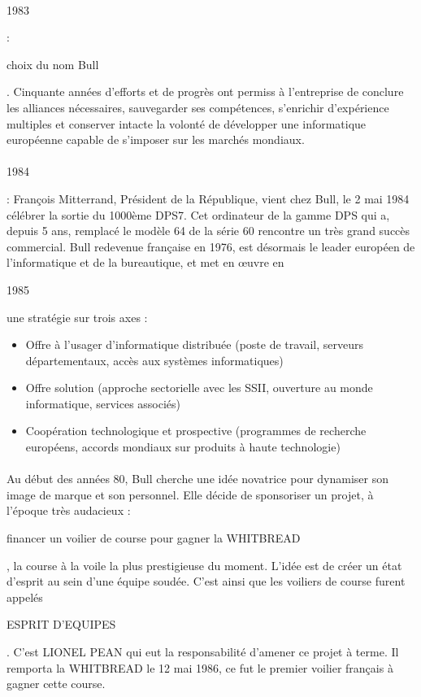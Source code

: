 \documentclass[11pt]{article}
\begin{document}
		\paragraph{}
		\begin{bf}1983\end{bf}: \begin{bf}choix du nom Bull\end{bf}. Cinquante années d’efforts et de progrès ont permiss à 
		l’entreprise de conclure les alliances nécessaires, sauvegarder ses compétences, s’enrichir d’expérience multiples et 
		conserver intacte la volonté de développer une informatique européenne capable de s’imposer sur les marchés mondiaux.
		\paragraph{}
		\begin{bf}1984\end{bf}: François Mitterrand, Président de la République, vient chez Bull, le 2 mai 1984 célébrer la 
		sortie du 1000ème DPS7. Cet ordinateur de la gamme DPS qui a, depuis 5 ans, remplacé le modèle 64 de la série 60 
		rencontre un très grand succès commercial. Bull redevenue française en 1976, est désormais le leader européen de 
		l’informatique et de la bureautique, et met en œuvre en \begin{bf}1985\end{bf} une stratégie sur trois axes :
		\begin{itemize}
			\item Offre à l’usager d’informatique distribuée (poste de travail, serveurs départementaux, accès aux systèmes 
			informatiques)
			\item Offre solution (approche sectorielle avec les SSII, ouverture au monde informatique, services associés)
			\item Coopération technologique et prospective (programmes de recherche européens, accords mondiaux sur produits 
			à haute technologie)
		\end{itemize}
		\paragraph{}
		Au début des années 80, Bull cherche une idée novatrice pour dynamiser son image de marque et son personnel. 
		Elle décide de sponsoriser un projet, à l'époque très audacieux : \begin{bf}financer un voilier de course pour gagner 
		la WHITBREAD\end{bf}, la course à la voile la plus prestigieuse du moment. L'idée est de créer un état d'esprit au 
		sein d'une équipe soudée. C'est ainsi que les voiliers de course furent appelés \begin{bf}ESPRIT D'EQUIPES\end{bf}. 
		C'est LIONEL PEAN qui eut la responsabilité d'amener ce projet à terme. Il remporta la WHITBREAD le 12 mai 1986, ce 
		fut le premier voilier français à gagner cette course.
\end{document}
